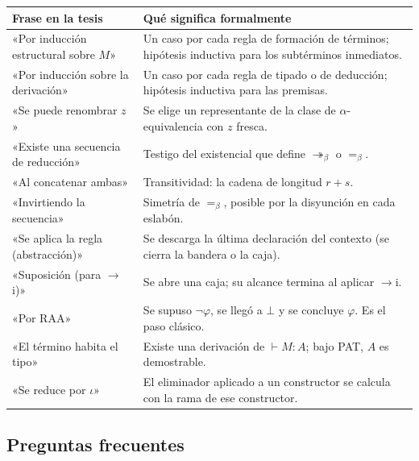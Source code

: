 \documentclass[11pt,a4paper]{article}
\newcommand{\bmred}{\twoheadrightarrow_\beta}
\newcommand{\beq}{=_\beta}
\begin{document}
{\small
\begin{longtable}{@{}p{}p{}@{}}
\toprule
\textbf{Frase en la tesis} & \textbf{Qué significa formalmente}\\
\midrule
\endhead
«Por inducción estructural sobre \(M\)» & Un caso por cada regla de formación
de términos; hipótesis inductiva para los subtérminos inmediatos.\\
«Por inducción sobre la derivación» & Un caso por cada regla de tipado o de
deducción; hipótesis inductiva para las premisas.\\
«Se puede renombrar \(z\)» & Se elige un representante de la clase de
\(\alpha\)-equivalencia con \(z\) fresca.\\
«Existe una secuencia de reducción» & Testigo del existencial que define
\(\bmred\) o \(\beq\).\\
«Al concatenar ambas» & Transitividad: la cadena de longitud \(r+s\).\\
«Invirtiendo la secuencia» & Simetría de \(\beq\), posible por la disyunción en
cada eslabón.\\
«Se aplica la regla (abstracción)» & Se descarga la última declaración del
contexto (se cierra la bandera o la caja).\\
«Suposición (para \(\to\)i)» & Se abre una caja; su alcance termina al
aplicar \(\to\)i.\\
«Por RAA» & Se supuso \(\neg\varphi\), se llegó a \(\bot\) y se concluye
\(\varphi\). Es el paso clásico.\\
«El término habita el tipo» & Existe una derivación de \(\vdash M:A\); bajo
PAT, \(A\) es demostrable.\\
«Se reduce por \(\iota\)» & El eliminador aplicado a un constructor se
calcula con la rama de ese constructor.\\
\bottomrule
\end{longtable}
}

\subsection{Preguntas frecuentes}
\end{document}
